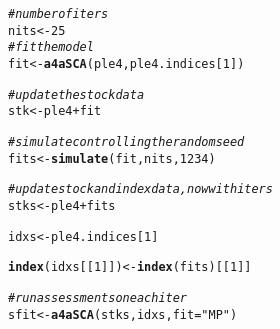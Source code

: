 \documentclass[a4paper,english,10pt]{article}\usepackage[]{graphicx}\usepackage[]{color}
\makeatletter
\newcommand{\hlnum}[1]{\textcolor[rgb]{0.686,0.059,0.569}{#1}}%
\newcommand{\hlstr}[1]{\textcolor[rgb]{0.192,0.494,0.8}{#1}}%
\newcommand{\hlcom}[1]{\textcolor[rgb]{0.678,0.584,0.686}{\textit{#1}}}%
\newcommand{\hlopt}[1]{\textcolor[rgb]{0,0,0}{#1}}%
\newcommand{\hlstd}[1]{\textcolor[rgb]{0.345,0.345,0.345}{#1}}%
\newcommand{\hlkwb}[1]{\textcolor[rgb]{0.69,0.353,0.396}{#1}}%
\newcommand{\hlkwc}[1]{\textcolor[rgb]{0.333,0.667,0.333}{#1}}%
\newcommand{\hlkwd}[1]{\textcolor[rgb]{0.737,0.353,0.396}{\textbf{#1}}}%
\newenvironment{kframe}{%
 \def\at@end@of@kframe{}%
 \ifinner\ifhmode%
  \def\at@end@of@kframe{\end{minipage}}%
  \begin{minipage}{\columnwidth}%
 \fi\fi%
 \def\FrameCommand##1{\hskip\@totalleftmargin \hskip-\fboxsep
 \colorbox{shadecolor}{##1}\hskip-\fboxsep
     \hskip-\linewidth \hskip-\@totalleftmargin \hskip\columnwidth}%
 \MakeFramed {\advance\hsize-\width
   \@totalleftmargin\z@ \linewidth\hsize
   \@setminipage}}%
 {\par\unskip\endMakeFramed%
 \at@end@of@kframe}
\newenvironment{knitrout}{}{} %
\makeatother
\begin{document}
\begin{knitrout}
\color{fgcolor}\begin{kframe}
\begin{alltt}
\hlcom{# number of iters}
\hlstd{nits} \hlkwb{<-} \hlnum{25}
\hlcom{# fit the model}
\hlstd{fit} \hlkwb{<-} \hlkwd{a4aSCA}\hlstd{(ple4, ple4.indices[}\hlnum{1}\hlstd{])}
\end{alltt}


{\ttfamily\noindent\bfseries{}}\begin{alltt}
\hlcom{# update the stock data}
\hlstd{stk} \hlkwb{<-} \hlstd{ple4} \hlopt{+} \hlstd{fit}
\end{alltt}


{\ttfamily\noindent\bfseries\color{errorcolor}{\#\# Error: object 'ple4' not found}}\begin{alltt}
\hlcom{# simulate controlling the random seed}
\hlstd{fits} \hlkwb{<-} \hlkwd{simulate}\hlstd{(fit, nits,} \hlnum{1234}\hlstd{)}
\end{alltt}


{\ttfamily\noindent\bfseries\color{errorcolor}{\#\# Error: object 'fit' not found}}\begin{alltt}
\hlcom{# update stock and index data, now with iters}
\hlstd{stks} \hlkwb{<-} \hlstd{ple4} \hlopt{+} \hlstd{fits}
\end{alltt}


{\ttfamily\noindent\bfseries\color{errorcolor}{\#\# Error: object 'ple4' not found}}\begin{alltt}
\hlstd{idxs} \hlkwb{<-} \hlstd{ple4.indices[}\hlnum{1}\hlstd{]}
\end{alltt}


{\ttfamily\noindent\bfseries\color{errorcolor}{\#\# Error: object 'ple4.indices' not found}}\begin{alltt}
\hlkwd{index}\hlstd{(idxs[[}\hlnum{1}\hlstd{]])} \hlkwb{<-} \hlkwd{index}\hlstd{(fits)[[}\hlnum{1}\hlstd{]]}
\end{alltt}


{\ttfamily\noindent\bfseries{}}\begin{alltt}
\hlcom{# run assessments on each iter}
\hlstd{sfit} \hlkwb{<-} \hlkwd{a4aSCA}\hlstd{(stks, idxs,} \hlkwc{fit}\hlstd{=}\hlstr{"MP"}\hlstd{)}
\end{alltt}


{\ttfamily\noindent\bfseries{}}\end{kframe}
\end{knitrout}
\end{document}
